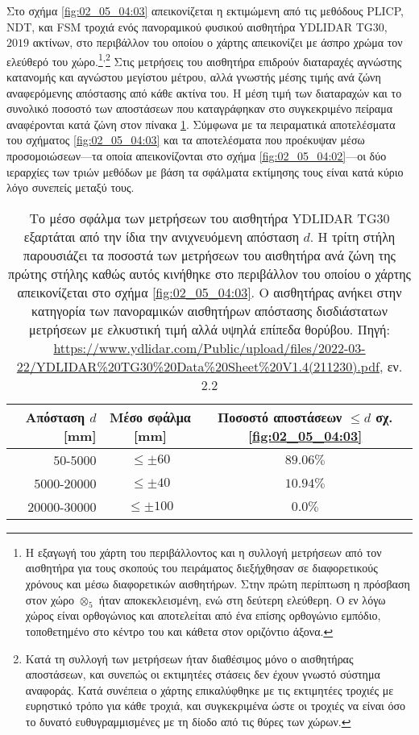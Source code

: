 Στο σχήμα \ref{fig:02_05_04:03} απεικονίζεται η εκτιμώμενη από τις μεθόδους
PLICP, NDT, και FSM τροχιά ενός πανοραμικού φυσικού αισθητήρα YDLIDAR TG30,
$2019$ ακτίνων, στο περιβάλλον του οποίου ο χάρτης απεικονίζει με άσπρο χρώμα
τον ελεύθερό του χώρο.\footnote{Η εξαγωγή του χάρτη του περιβάλλοντος και η
συλλογή μετρήσεων από τον αισθητήρα για τους σκοπούς του πειράματος διεξήχθησαν
σε διαφορετικούς χρόνους και μέσω διαφορετικών αισθητήρων. Στην πρώτη περίπτωση
η πρόσβαση στον χώρο $\otimes_5$ ήταν αποκεκλεισμένη, ενώ στη δεύτερη ελεύθερη.
Ο εν λόγω χώρος είναι ορθογώνιος και αποτελείται από ένα επίσης ορθογώνιο
εμπόδιο, τοποθετημένο στο κέντρο του και κάθετα στον οριζόντιο
άξονα.}\textsuperscript{,}\footnote{Κατά τη συλλογή των μετρήσεων ήταν
διαθέσιμος μόνο ο αισθητήρας αποστάσεων, και συνεπώς οι εκτιμητέες στάσεις δεν
έχουν γνωστό σύστημα αναφοράς. Κατά συνέπεια ο χάρτης επικαλύφθηκε με τις
εκτιμητέες τροχιές με ευρηστικό τρόπο για κάθε τροχιά, και συγκεκριμένα ώστε οι
τροχιές να είναι όσο το δυνατό ευθυγραμμισμένες με τη δίοδο από τις θύρες των
χώρων.} Στις μετρήσεις του αισθητήρα επιδρούν διαταραχές αγνώστης κατανομής και
αγνώστου μεγίστου μέτρου, αλλά γνωστής μέσης τιμής ανά ζώνη αναφερόμενης
απόστασης από κάθε ακτίνα του. Η μέση τιμή των διαταραχών και το συνολικό
ποσοστό των αποστάσεων που καταγράφηκαν στο συγκεκριμένο πείραμα αναφέρονται
κατά ζώνη στον πίνακα \ref{tbl:02:05_04:tg30}. Σύμφωνα με τα πειραματικά
αποτελέσματα του σχήματος \ref{fig:02_05_04:03} και τα αποτελέσματα που
προέκυψαν μέσω προσομοιώσεων---τα οποία απεικονίζονται στο σχήμα
\ref{fig:02_05_04:02}---οι δύο ιεραρχίες των τριών μεθόδων με βάση τα σφάλματα
εκτίμησης τους είναι κατά κύριο λόγο συνεπείς μεταξύ τους.


\begin{table}[h]\centering \vspace{0.5cm}
  \begin{tabular}{rcc}
    Απόσταση $d$ [mm]   & Μέσο σφάλμα [mm]    & Ποσοστό αποστάσεων $\leq d$ σχ. \ref{fig:02_05_04:03} \\ \toprule
    $50$-$5000$         & $\leq \pm 60$       & $89.06\%$  \\
    $5000$-$20000$      & $\leq \pm 40$       & $10.94\%$  \\
    $20000$-$30000$     & $\leq \pm 100$      & $0.0\%$    \\  \bottomrule
  \end{tabular}
  \caption{\small Το μέσο σφάλμα των μετρήσεων του αισθητήρα YDLIDAR TG30
           εξαρτάται από την ίδια την ανιχνευόμενη απόσταση $d$. Η τρίτη στήλη
           παρουσιάζει τα ποσοστά των μετρήσεων του αισθητήρα ανά ζώνη της
           πρώτης στήλης καθώς αυτός κινήθηκε στο περιβάλλον του οποίου ο
           χάρτης απεικονίζεται στο σχήμα \ref{fig:02_05_04:03}. Ο αισθητήρας
           ανήκει στην κατηγορία των πανοραμικών αισθητήρων απόστασης
           δισδιάστατων μετρήσεων με ελκυστική τιμή αλλά υψηλά επίπεδα
           θορύβου. Πηγή: \url{https://www.ydlidar.com/Public/upload/files/2022-03-22/YDLIDAR\%20TG30\%20Data\%20Sheet\%20V1.4(211230).pdf}, εν. 2.2}
  \label{tbl:02:05_04:tg30}
\end{table}

